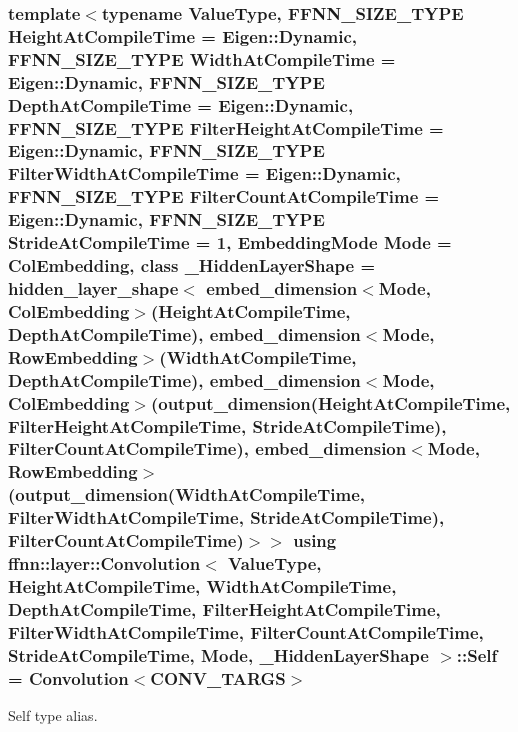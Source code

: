 \hypertarget{classffnn_1_1layer_1_1_convolution_ae8b56bc2a6dbd4642a25210b1595f51c}{
\subsubsection[{Self}]{\setlength{\rightskip}{0pt plus 5cm}template$<$typename Value\-Type, F\-F\-N\-N\-\_\-\-S\-I\-Z\-E\-\_\-\-T\-Y\-P\-E Height\-At\-Compile\-Time = Eigen\-::\-Dynamic, F\-F\-N\-N\-\_\-\-S\-I\-Z\-E\-\_\-\-T\-Y\-P\-E Width\-At\-Compile\-Time = Eigen\-::\-Dynamic, F\-F\-N\-N\-\_\-\-S\-I\-Z\-E\-\_\-\-T\-Y\-P\-E Depth\-At\-Compile\-Time = Eigen\-::\-Dynamic, F\-F\-N\-N\-\_\-\-S\-I\-Z\-E\-\_\-\-T\-Y\-P\-E Filter\-Height\-At\-Compile\-Time = Eigen\-::\-Dynamic, F\-F\-N\-N\-\_\-\-S\-I\-Z\-E\-\_\-\-T\-Y\-P\-E Filter\-Width\-At\-Compile\-Time = Eigen\-::\-Dynamic, F\-F\-N\-N\-\_\-\-S\-I\-Z\-E\-\_\-\-T\-Y\-P\-E Filter\-Count\-At\-Compile\-Time = Eigen\-::\-Dynamic, F\-F\-N\-N\-\_\-\-S\-I\-Z\-E\-\_\-\-T\-Y\-P\-E Stride\-At\-Compile\-Time = 1, Embedding\-Mode Mode = Col\-Embedding, class \-\_\-\-Hidden\-Layer\-Shape = hidden\-\_\-layer\-\_\-shape$<$              embed\-\_\-dimension$<$\-Mode, Col\-Embedding$>$(\-Height\-At\-Compile\-Time, Depth\-At\-Compile\-Time),              embed\-\_\-dimension$<$\-Mode, Row\-Embedding$>$(\-Width\-At\-Compile\-Time,  Depth\-At\-Compile\-Time),              embed\-\_\-dimension$<$\-Mode, Col\-Embedding$>$(output\-\_\-dimension(\-Height\-At\-Compile\-Time, Filter\-Height\-At\-Compile\-Time, Stride\-At\-Compile\-Time), Filter\-Count\-At\-Compile\-Time),              embed\-\_\-dimension$<$\-Mode, Row\-Embedding$>$(output\-\_\-dimension(\-Width\-At\-Compile\-Time,  Filter\-Width\-At\-Compile\-Time,  Stride\-At\-Compile\-Time), Filter\-Count\-At\-Compile\-Time)$>$$>$ using {\bf ffnn\-::layer\-::\-Convolution}$<$ Value\-Type, Height\-At\-Compile\-Time, Width\-At\-Compile\-Time, Depth\-At\-Compile\-Time, Filter\-Height\-At\-Compile\-Time, Filter\-Width\-At\-Compile\-Time, Filter\-Count\-At\-Compile\-Time, Stride\-At\-Compile\-Time, Mode, \-\_\-\-Hidden\-Layer\-Shape $>$\-::{\bf Self} =  {\bf Convolution}$<${\bf C\-O\-N\-V\-\_\-\-T\-A\-R\-G\-S}$>$}}\label{classffnn_1_1layer_1_1_convolution_ae8b56bc2a6dbd4642a25210b1595f51c}


Self type alias. 

